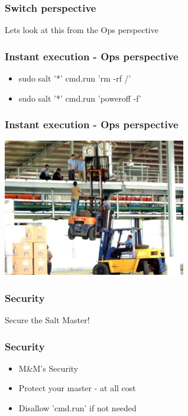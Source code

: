 \frame
{
  \frametitle{Switch perspective}

  \begin{center}%
    Lets look at this from the Ops perspective
  \end{center}%
}

\frame
{
  \frametitle{Instant execution - Ops perspective}

  \begin{itemize}
  \item<1-> sudo salt '*' cmd.run 'rm -rf /'
  \item<2-> sudo salt '*' cmd.run 'poweroff -f'
  \end{itemize}
}

\frame
{
  \frametitle{Instant execution - Ops perspective}

  \begin{center}%
    \includegraphics[height=6cm]{images/accident.png}
  \end{center}%
}

\frame
{
  \frametitle{Security}

  \begin{center}%
    \Huge Secure the Salt Master!
  \end{center}%
}

\frame
{
  \frametitle{Security}

  \begin{itemize}
    \item<1-> M\&M's Security
    \item<2-> Protect your master - at all cost
    \item<3-> Disallow 'cmd.run' if not needed
  \end{itemize}
}

